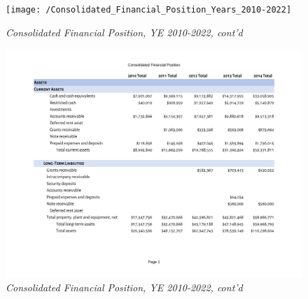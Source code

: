\begin{figure}
  \caption*{\textit{Consolidated Financial Position, YE 2010-2022, cont'd}}
 \label{fig:consolidated_financial_position_2010-2022} %
 \texttt{[image: /Consolidated\_Financial\_Position\_Years\_2010-2022]} %
\end{figure}

\begin{figure}
  \caption*{\textit{Consolidated Financial Position, YE 2010-2022, cont'd}}
 \label{fig:consolidated_financial_position_2010-2022} %
 \includegraphics[page=4,width=\textheight]{Consolidated_Financial_Position_Years_2010-2022} %
\end{figure}

